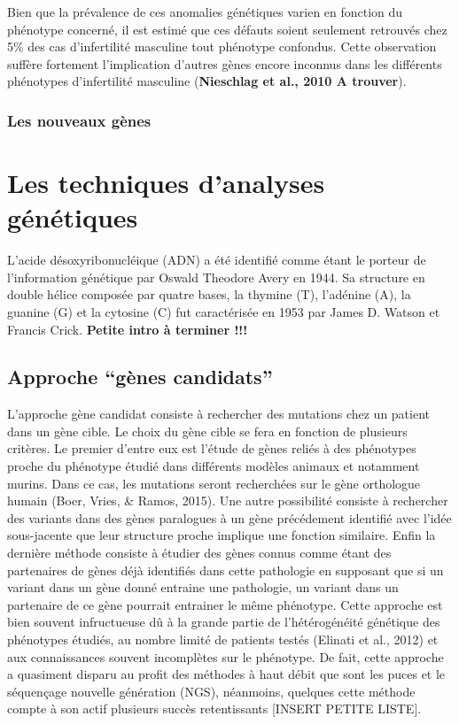\documentclass[12pt,twoside]{reedthesis}
\theoremstyle{definition}
\theoremstyle{definition}
\theoremstyle{remark}
\begin{document}
  Bien que la prévalence de ces anomalies génétiques varien en fonction du
  phénotype concerné, il est estimé que ces défauts soient seulement
  retrouvés chez 5\% des cas d'infertilité masculine tout phénotype
  confondus. Cette observation suffère fortement l'implication d'autres
  gènes encore inconnus dans les différents phénotypes d'infertilité
  masculine (\textbf{Nieschlag et al., 2010 A trouver}).
  
  \subsubsection{Les nouveaux gènes}\label{les-nouveaux-genes}
  
  \newpage  
  
  \section{Les techniques d'analyses
  génétiques}\label{les-techniques-danalyses-genetiques}
  
  L'acide désoxyribonucléique (ADN) a été identifié comme étant le porteur
  de l'information génétique par Oswald Theodore Avery en 1944. Sa
  structure en double hélice composée par quatre bases, la thymine (T),
  l'adénine (A), la guanine (G) et la cytosine (C) fut caractérisée en
  1953 par James D. Watson et Francis Crick. \textbf{Petite intro à
  terminer !!!}
  
  \subsection{\texorpdfstring{Approche ``gènes
  candidats''}{Approche gènes candidats}}\label{approche-genes-candidats}
  
  L'approche gène candidat consiste à rechercher des mutations chez un
  patient dans un gène cible. Le choix du gène cible se fera en fonction
  de plusieurs critères. Le premier d'entre eux est l'étude de gènes
  reliés à des phénotypes proche du phénotype étudié dans différents
  modèles animaux et notamment murins. Dans ce cas, les mutations seront
  recherchées sur le gène orthologue humain (Boer, Vries, \& Ramos, 2015).
  Une autre possibilité consiste à rechercher des variants dans des gènes
  paralogues à un gène précédement identifié avec l'idée sous-jacente que
  leur structure proche implique une fonction similaire. Enfin la dernière
  méthode consiste à étudier des gènes connus comme étant des partenaires
  de gènes déjà identifiés dans cette pathologie en supposant que si un
  variant dans un gène donné entraine une pathologie, un variant dans un
  partenaire de ce gène pourrait entrainer le même phénotype. Cette
  approche est bien souvent infructueuse dû à la grande partie de
  l'hétérogénéité génétique des phénotypes étudiés, au nombre limité de
  patients testés (Elinati et al., 2012) et aux connaissances souvent
  incomplètes sur le phénotype. De fait, cette approche a quasiment
  disparu au profit des méthodes à haut débit que sont les puces et le
  séquençage nouvelle génération (NGS), néanmoins, quelques cette méthode
  compte à son actif plusieurs succès retentissants {[}INSERT PETITE
  LISTE{]}.
  
\end{document}
